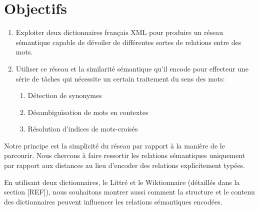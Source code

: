 
\section{Objectifs}

\begin{enumerate}

\item{Exploiter deux dictionnaires français XML pour produire un réseau 
sémantique capable de dévoiler de différentes sortes de relations entre des 
mots.}

\item{Utiliser ce réseau et la similarité sémantique qu'il encode pour 
effecteur une série de tâches qui nécessite un certain traitement du sens des 
mots:}

    \begin{enumerate}
    \item{Détection de synonymes}
    \item{Désambiguïsation de mots en contextes}
    \item{Résolution d'indices de mots-croisés}
    \end{enumerate}

\end{enumerate}

Notre principe est la simplicité du réseau par rapport à la manière de le 
parcourir. Nous chercons à faire ressortir les relations sémantiques uniquement 
par rapport aux distances au lieu d'encoder des relations explicitement typées.

En utilisant deux dictionnaires, le Littré et le Wiktionnaire (détaillés dans 
la section [REF]), nous souhaitons montrer aussi comment la structure et le 
contenu des dictionnaires peuvent influencer les relations sémantiques encodées.
